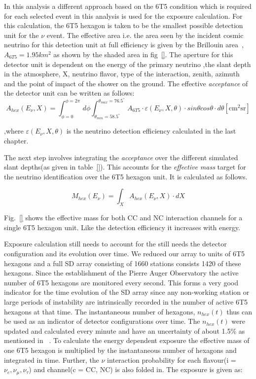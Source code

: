 In this analysis a different approach based on the 6T5 condition which is required for each selected event in this analysis is used for the exposure calculation. For this calculation, the 6T5 hexagon is taken to be the smallest possible detection unit for the $\nu$ event. The effective area i.e. the area seen by the incident cosmic neutrino for this detection unit at full efficiency is given by the Brillouin area~\cite{}, $A_{6T5} = 1.95km^2$ as shown by the shaded area in fig~\ref{}. The aperture for this detector unit is dependent on the energy of the primary neutrino ,the slant depth in the atmosphere, X, neutrino flavor, type of the interaction, zenith, azimuth and the point of impact of the shower on the ground. The effective \textit{acceptance} of the detector unit can be written as follows:
\begin{equation}
  A_{hex}(E_{\nu}, X)  = \int^{\phi = 2\pi}_{\phi = 0} \,d\phi \int_{\theta_{min} = 58.5^{\circ}}^{\theta_{max}= 76.5^{\circ}}  \, A_{6T5} \cdot \varepsilon(E_{\nu}, X, \theta) \cdot sin\theta cos\theta \cdot d\theta    \mathrm{[cm^2 sr]}
\end{equation}

,where $\varepsilon(E_{\nu}, X, \theta)$ is the neutrino detection efficiency calculated in the last chapter. 

The next step involves integrating the \textit{acceptance} over the different simulated slant depths(as given in table~\ref{}). This accounts for the \textit{effective mass} target for the neutrino identification over the 6T5 hexagon unit. It is calculated as follows. 

\begin{equation}
  M_{hex}(E_{\nu}) = \int_X A_{hex}(E_{\nu}, X) \cdot dX
\end{equation}

Fig.~\ref{} shows the effective mass for both CC and NC interaction channels for a single 6T5 hexagon unit. Like the detection efficiency it increases with energy. 

Exposure calculation still needs to account for the still needs the detector configuration and its evolution over time. We reduced our array to units of 6T5 hexagons and a full SD array consisting of 1660 stations consists 1420 of these hexagons. Since the establishment of the Pierre Auger Observatory the active number of 6T5 hexagons are monitored every second. This forms a very good indicator for the time evolution of the SD array since any non-working station or large periods of instability are intrinsically recorded in the number of active 6T5 hexagons at that time. The instantaneous number of hexagons, $n_{hex}(t)$ thus can be used as an indicator of detector configurations over time. The $n_{hex}(t)$ were updated and calculated every minute and have an uncertainty of about 1.5\% as mentioned in ~\cite{}. To calculate the energy dependent exposure the effective mass of one 6T5 hexagon is multiplied by the instantaneous number of hexagons and integrated in time. Further, the $\nu$ interaction probability for each flavour(i = $\nu_e, \nu_{\mu}, \nu_{\tau}$) and channel(c = CC, NC) is also folded in. The exposure is given as:

